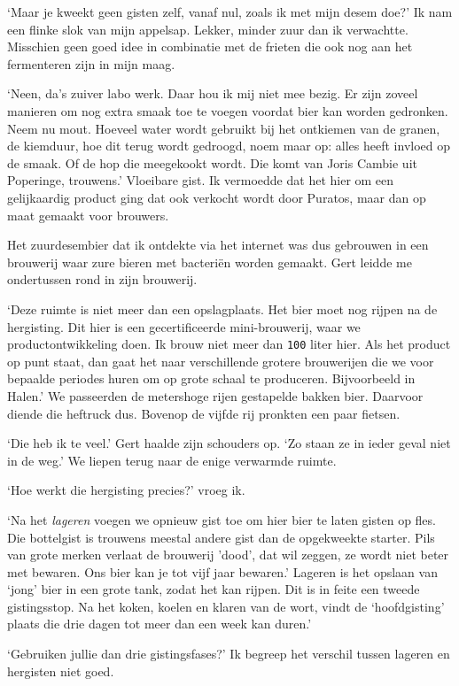 \documentclass[
  11pt,
  dutch,
]{memoir}
\begin{document}
`Maar je kweekt geen gisten zelf, vanaf nul, zoals ik met mijn desem
doe?' Ik nam een flinke slok van mijn appelsap. Lekker, minder zuur dan
ik verwachtte. Misschien geen goed idee in combinatie met de frieten die
ook nog aan het fermenteren zijn in mijn maag.

`Neen, da's zuiver labo werk. Daar hou ik mij niet mee bezig. Er zijn
zoveel manieren om nog extra smaak toe te voegen voordat bier kan worden
gedronken. Neem nu mout. Hoeveel water wordt gebruikt bij het ontkiemen
van de granen, de kiemduur, hoe dit terug wordt gedroogd, noem maar op:
alles heeft invloed op de smaak. Of de hop die meegekookt wordt. Die
komt van Joris Cambie uit Poperinge, trouwens.' Vloeibare gist. Ik
vermoedde dat het hier om een gelijkaardig product ging dat ook verkocht
wordt door Puratos, maar dan op maat gemaakt voor brouwers.

Het zuurdesembier dat ik ontdekte via het internet was dus gebrouwen in
een brouwerij waar zure bieren met bacteriën worden gemaakt. Gert leidde
me ondertussen rond in zijn brouwerij.

`Deze ruimte is niet meer dan een opslagplaats. Het bier moet nog rijpen
na de hergisting. Dit hier is een gecertificeerde mini-brouwerij, waar
we productontwikkeling doen. Ik brouw niet meer dan \texttt{100} liter
hier. Als het product op punt staat, dan gaat het naar verschillende
grotere brouwerijen die we voor bepaalde periodes huren om op grote
schaal te produceren. Bijvoorbeeld in Halen.' We passeerden de
metershoge rijen gestapelde bakken bier. Daarvoor diende die heftruck
dus. Bovenop de vijfde rij pronkten een paar fietsen.

`Die heb ik te veel.' Gert haalde zijn schouders op. `Zo staan ze in
ieder geval niet in de weg.' We liepen terug naar de enige verwarmde
ruimte.

`Hoe werkt die hergisting precies?' vroeg ik.

`Na het \emph{lageren} voegen we opnieuw gist toe om hier bier te laten
gisten op fles. Die bottelgist is trouwens meestal andere gist dan de
opgekweekte starter. Pils van grote merken verlaat de brouwerij 'dood',
dat wil zeggen, ze wordt niet beter met bewaren. Ons bier kan je tot
vijf jaar bewaren.' Lageren is het opslaan van `jong' bier in een grote
tank, zodat het kan rijpen. Dit is in feite een tweede gistingsstop. Na
het koken, koelen en klaren van de wort, vindt de `hoofdgisting' plaats
die drie dagen tot meer dan een week kan duren.'

`Gebruiken jullie dan drie gistingsfases?' Ik begreep het verschil
tussen lageren en hergisten niet goed.
\end{document}
